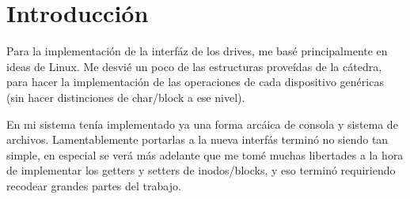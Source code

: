 \section{Introducción}

Para la implementación de la interfáz de los drives, me basé principalmente en
ideas de Linux. Me desvié un poco de las estructuras proveídas de la cátedra,
para hacer la implementación de las operaciones de cada dispositivo genéricas
(sin hacer distinciones de char/block a ese nivel).

En mi sistema tenía implementado ya una forma arcáica de consola y sistema de
archivos. Lamentablemente portarlas a la nueva interfás terminó no siendo tan
simple, en especial se verá más adelante que me tomé muchas libertades a la
hora de implementar los getters y setters de inodos/blocks, y eso terminó
requiriendo recodear grandes partes del trabajo.

